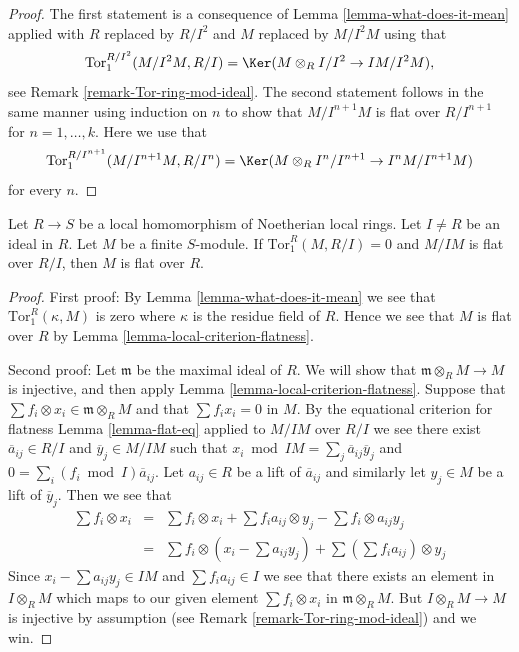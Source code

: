 \begin{proof}
The first statement is a consequence of
Lemma \ref{lemma-what-does-it-mean} applied with $R$ replaced by $R/I^2$
and $M$ replaced by $M/I^2M$ using that
$$
\text{Tor}_1^{R/I^2}(M/I^2M, R/I) =
\Ker(M \otimes_R I/I^2 \to IM/I^2M),
$$
see Remark \ref{remark-Tor-ring-mod-ideal}.
The second statement follows in the same manner using induction
on $n$ to show that $M/I^{n + 1}M$ is flat over $R/I^{n + 1}$ for
$n = 1, \ldots, k$. Here we use that
$$
\text{Tor}_1^{R/I^{n + 1}}(M/I^{n + 1}M, R/I^n) =
\Ker(M \otimes_R I^n/I^{n + 1} \to I^nM/I^{n + 1}M)
$$
for every $n$.
\end{proof}

\begin{lemma}
\label{lemma-variant-local-criterion-flatness}
Let $R \to S$ be a local homomorphism of Noetherian
local rings. Let $I \not = R$ be an ideal in $R$.
Let $M$ be a finite $S$-module. If $\text{Tor}_1^R(M, R/I) = 0$
and $M/IM$ is flat over $R/I$, then $M$ is flat over $R$.
\end{lemma}

\begin{proof}
First proof: By
Lemma \ref{lemma-what-does-it-mean}
we see that $\text{Tor}_1^R(\kappa, M)$ is zero where $\kappa$
is the residue field of $R$. Hence we see that $M$
is flat over $R$ by
Lemma \ref{lemma-local-criterion-flatness}.

\medskip\noindent
Second proof: Let $\mathfrak m$ be the maximal ideal of $R$.
We will show that $\mathfrak m \otimes_R M \to M$ is injective,
and then apply
Lemma \ref{lemma-local-criterion-flatness}.
Suppose that $\sum f_i \otimes x_i \in \mathfrak m \otimes_R M$
and that $\sum f_i x_i = 0$ in $M$. By the equational criterion
for flatness Lemma \ref{lemma-flat-eq} applied to $M/IM$
over $R/I$ we see there exist $\overline{a}_{ij} \in R/I$
and $\overline{y}_j \in M/IM$ such that
$x_i \bmod IM = \sum_j \overline{a}_{ij} \overline{y}_j $
and $0 = \sum_i (f_i \bmod I) \overline{a}_{ij}$.
Let $a_{ij} \in R$ be a lift of $\overline{a}_{ij}$ and
similarly let $y_j \in M$ be a lift of $\overline{y}_j$.
Then we see that
\begin{eqnarray*}
\sum f_i \otimes x_i
& = &
\sum f_i \otimes x_i +
\sum f_ia_{ij} \otimes y_j -
\sum f_i \otimes a_{ij} y_j
\\
& = &
\sum f_i \otimes (x_i - \sum a_{ij} y_j) +
\sum (\sum f_i a_{ij}) \otimes y_j
\end{eqnarray*}
Since $x_i - \sum a_{ij} y_j \in IM$ and
$\sum f_i a_{ij} \in I$ we see that there exists
an element in $I \otimes_R M$ which maps to our given
element $\sum f_i \otimes x_i$ in $\mathfrak m \otimes_R M$.
But $I \otimes_R M \to M$ is injective by assumption (see
Remark \ref{remark-Tor-ring-mod-ideal}) and we win.
\end{proof}

